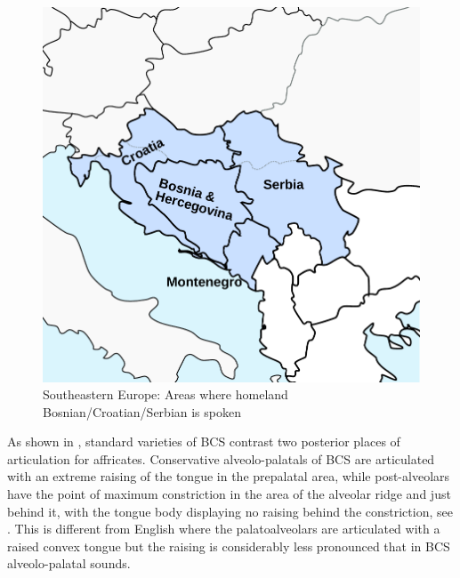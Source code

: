 \documentclass[output=paper,modfonts,newtxmath,hidelinks,]{langscibook}
\begin{document}
\begin{figure}
\includegraphics[height=.3\textheight]{figures/balkans.pdf}
\caption{\label{fig:mihajlovic:1}Southeastern Europe: Areas where homeland Bosnian/Croatian/Serbian is spoken}
\end{figure}

As shown in , standard varieties of BCS contrast two posterior places of articulation for affricates. Conservative alveolo-palatals of BCS are articulated with an extreme raising of the tongue in the prepalatal area, while post-alveolars have the point of maximum constriction in the area of the alveolar ridge and just behind it, with the tongue body displaying no raising behind the constriction, see . This is different from English where the palatoalveolars are articulated with a raised convex tongue but the raising is considerably less pronounced that in BCS alveolo-palatal sounds.
\end{document}
